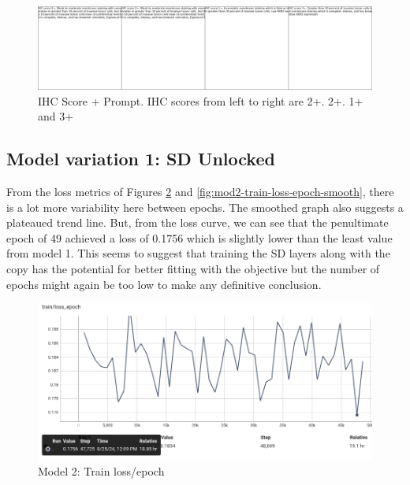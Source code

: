 \begin{figure}[h]
    \centering
    \includegraphics[width=1\linewidth]{5_Results/figures/conditioning_gs-020380_e-000020_b-000900.png}
    \caption[Input prompts for train log at e=20, steps=900]{IHC Score + Prompt. IHC scores from left to right are 2+. 2+. 1+ and 3+}
    \label{fig:train-log-prompt-e20-s900}
\end{figure}

\subsection{Model variation 1: SD Unlocked}

From the loss metrics of Figures \ref{fig:mod2-train-loss-epoch} and \ref{fig:mod2-train-loss-epoch-smooth}, there is a lot more variability here between epochs. The smoothed graph also suggests a plateaued trend line. But, from the loss curve, we can see that the penultimate epoch of 49 achieved a loss of 0.1756 which is slightly lower than the least value from model 1. This seems to suggest that training the SD layers along with the copy has the potential for better fitting with the objective but the number of epochs might again be too low to make any definitive conclusion.
\begin{figure}[h]
    \centering
    \includegraphics[width=1\linewidth]{5_Results/figures/sd2-train-loss-epoch.png}
    \caption{Model 2: Train loss/epoch}
    \label{fig:mod2-train-loss-epoch}
\end{figure}


